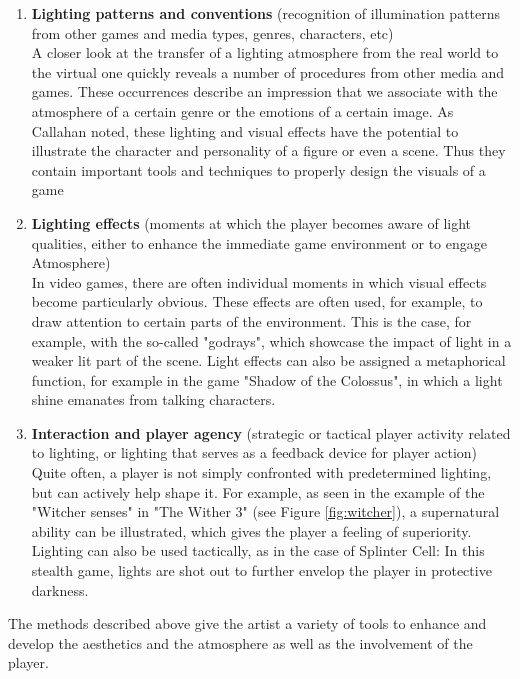 \begin{enumerate}
    \item \textbf{Lighting patterns and conventions} (recognition of illumination patterns from other games and media types, genres, characters, etc) \\
    A closer look at the transfer of a lighting atmosphere from the real world to the virtual one quickly reveals a number of procedures from other media and games. These occurrences describe an impression that we associate with the atmosphere of a certain genre or the emotions of a certain image. As Callahan noted, these lighting and visual effects have the potential to illustrate the character and personality of a figure or even a scene. Thus they contain important tools and techniques to properly design the visuals of a game \cite{Storytelling}
    
    \item \textbf{Lighting effects} (moments at which the player becomes aware of light qualities, either to enhance the immediate game environment or to engage Atmosphere)\\
    In video games, there are often individual moments in which visual effects become particularly obvious. These effects are often used, for example, to draw attention to certain parts of the environment. This is the case, for example, with the so-called "godrays", which showcase the impact of light in a weaker lit part of the scene. Light effects can also be assigned a metaphorical function, for example in the game "Shadow of the Colossus", in which a light shine emanates from talking characters. \cite{Niedenthal1404353}
    
    \item \textbf{Interaction and player agency} (strategic or tactical player activity related to lighting, or lighting that serves as a feedback device for player action)\\
    Quite often, a player is not simply confronted with predetermined lighting, but can actively help shape it. For example, as seen in the example of the "Witcher senses" in "The Wither 3" (see Figure \ref{fig:witcher}), a supernatural ability can be illustrated, which gives the player a feeling of superiority. Lighting can also be used tactically, as in the case of Splinter Cell: In this stealth game, lights are shot out to further envelop the player in protective darkness. 
    
\end{enumerate}

The methods described above give the artist a variety of tools to enhance and develop the aesthetics and the atmosphere as well as the involvement of the player.